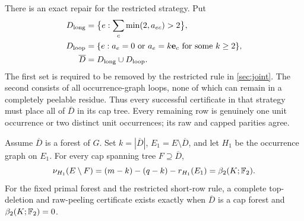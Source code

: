 There is an exact repair for the restricted strategy. Put
\begin{align}
 D_{\mathrm{long}}&=\bigl\{e:\sum_c\min(2,a_{ec})>2\bigr\},\notag\\
 D_{\mathrm{loop}}&=\{e:a_e=0\text{ or }a_e=k\mathbf e_c
                         \text{ for some }k\geq2\},\notag\\
 \overline D&=D_{\mathrm{long}}\cup D_{\mathrm{loop}}.
 \label{eq:mandatory-rows}
\end{align}
The first set is required to be removed by the restricted rule in
\cref{sec:joint}. The second consists of all occurrence-graph loops, none
of which can remain in a completely peelable residue. Thus every successful
certificate in that strategy must place all of $\overline D$ in its cap
tree. Every remaining row is genuinely one unit occurrence or two distinct
unit occurrences; its raw and capped parities agree.

\begin{theorem}
\label{thm:mandatory-chain}
Assume $\overline D$ is a forest of $G$. Set $k=|\overline D|$,
$E_1=E\setminus\overline D$, and let $H_1$ be the occurrence graph on $E_1$.
For every cap spanning tree $F\supseteq\overline D$,
\begin{equation}
 \nu_{H_1}(E\setminus F)
   =(m-k)-(q-k)-r_{H_1}(E_1)
   =\beta_2(K;\mathbb F_2).
 \label{eq:mandatory-beta}
\end{equation}
For the fixed primal forest and the restricted short-row rule, a complete
top-deletion and raw-peeling certificate exists exactly when
$\overline D$ is a cap forest and $\beta_2(K;\mathbb F_2)=0$.
\end{theorem}

